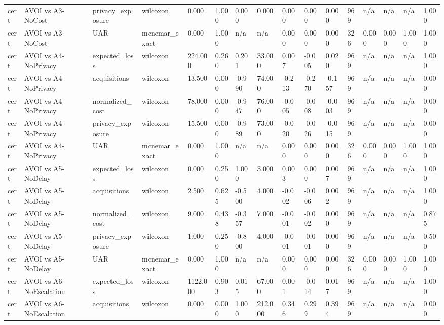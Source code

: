 \begin{table}[!ht]
{\begin{tabular}{llllllllllllllll}
cert & AVOI vs A3-NoCost & privacy\_exposure & wilcoxon & 0.000 & 1.000 & 0.000 & 0.000 & 0.000 & 0.000 & 0.000 & 969 & n/a & n/a & n/a & 1.000 \\
cert & AVOI vs A3-NoCost & UAR & mcnemar\_exact & 0.000 & 1.000 & n/a & n/a & 0.000 & 0.000 & 0.000 & 326 & 0.000 & 0.000 & 1.000 & 1.000 \\
cert & AVOI vs A4-NoPrivacy & expected\_loss & wilcoxon & 224.000 & 0.260 & 0.201 & 33.000 & 0.007 & -0.005 & 0.020 & 969 & n/a & n/a & n/a & 1.000 \\
cert & AVOI vs A4-NoPrivacy & acquisitions & wilcoxon & 13.500 & 0.000 & -0.990 & 74.000 & -0.213 & -0.270 & -0.157 & 969 & n/a & n/a & n/a & 0.000 \\
cert & AVOI vs A4-NoPrivacy & normalized\_cost & wilcoxon & 78.000 & 0.000 & -0.947 & 76.000 & -0.005 & -0.008 & -0.003 & 969 & n/a & n/a & n/a & 0.000 \\
cert & AVOI vs A4-NoPrivacy & privacy\_exposure & wilcoxon & 15.500 & 0.000 & -0.989 & 73.000 & -0.020 & -0.026 & -0.015 & 969 & n/a & n/a & n/a & 0.000 \\
cert & AVOI vs A4-NoPrivacy & UAR & mcnemar\_exact & 0.000 & 1.000 & n/a & n/a & 0.000 & 0.000 & 0.000 & 326 & 0.000 & 0.000 & 1.000 & 1.000 \\
cert & AVOI vs A5-NoDelay & expected\_loss & wilcoxon & 0.000 & 0.250 & 1.000 & 3.000 & 0.003 & 0.000 & 0.007 & 969 & n/a & n/a & n/a & 1.000 \\
cert & AVOI vs A5-NoDelay & acquisitions & wilcoxon & 2.500 & 0.625 & -0.500 & 4.000 & -0.002 & -0.006 & 0.002 & 969 & n/a & n/a & n/a & 1.000 \\
cert & AVOI vs A5-NoDelay & normalized\_cost & wilcoxon & 9.000 & 0.438 & -0.357 & 7.000 & -0.001 & -0.002 & 0.000 & 969 & n/a & n/a & n/a & 0.875 \\
cert & AVOI vs A5-NoDelay & privacy\_exposure & wilcoxon & 1.000 & 0.250 & -0.800 & 4.000 & -0.001 & -0.001 & 0.000 & 969 & n/a & n/a & n/a & 0.500 \\
cert & AVOI vs A5-NoDelay & UAR & mcnemar\_exact & 0.000 & 1.000 & n/a & n/a & 0.000 & 0.000 & 0.000 & 326 & 0.000 & 0.000 & 1.000 & 1.000 \\
cert & AVOI vs A6-NoEscalation & expected\_loss & wilcoxon & 1122.000 & 0.903 & 0.015 & 67.000 & 0.001 & -0.014 & 0.017 & 969 & n/a & n/a & n/a & 1.000 \\
cert & AVOI vs A6-NoEscalation & acquisitions & wilcoxon & 0.000 & 0.000 & 1.000 & 212.000 & 0.346 & 0.299 & 0.394 & 969 & n/a & n/a & n/a & 0.000 \\

\end{tabular}}
\end{table}
